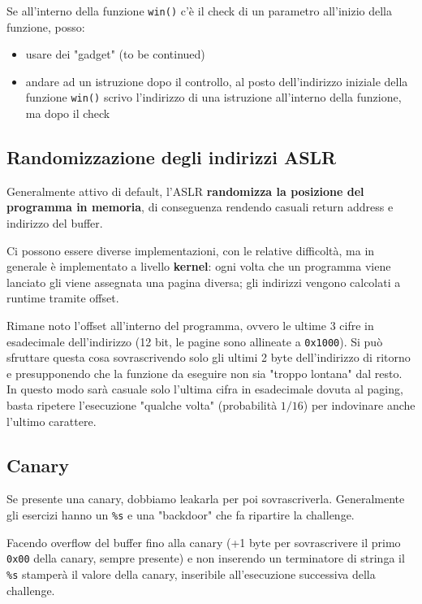 Se all'interno della funzione \texttt{win()} c'è il check di un parametro all'inizio della funzione, posso:
\begin{itemize}
	\item usare dei "gadget" (to be continued)
	
    \item andare ad un istruzione dopo il controllo, al posto dell'indirizzo iniziale della funzione \texttt{win()} scrivo l'indirizzo di una istruzione all'interno della funzione, ma dopo il check
\end{itemize}

\subsection{Randomizzazione degli indirizzi ASLR}

Generalmente attivo di default, l'ASLR \textbf{randomizza la posizione del programma in memoria}, di conseguenza rendendo casuali return address e indirizzo del buffer. 

Ci possono essere diverse implementazioni, con le relative difficoltà, ma in generale è implementato a livello \textbf{kernel}: ogni volta che un programma viene lanciato gli viene assegnata una pagina diversa; gli indirizzi vengono calcolati a runtime tramite offset.

Rimane noto l'offset all'interno del programma, ovvero le ultime 3 cifre in esadecimale dell'indirizzo (12 bit, le pagine sono allineate a \texttt{0x1000}). Si può sfruttare questa cosa sovrascrivendo solo gli ultimi 2 byte dell'indirizzo di ritorno e presupponendo che la funzione da eseguire non sia "troppo lontana" dal resto. In questo modo sarà casuale solo l'ultima cifra in esadecimale dovuta al paging, basta ripetere l'esecuzione "qualche volta" (probabilità $1/16$) per indovinare anche l'ultimo carattere.

\subsection{Canary}

Se presente una canary, dobbiamo leakarla per poi sovrascriverla. Generalmente gli esercizi hanno un \texttt{\%s} e una "backdoor" che fa ripartire la challenge. 

Facendo overflow del buffer fino alla canary (+1 byte per sovrascrivere il primo \texttt{0x00} della canary, sempre presente) e non inserendo un terminatore di stringa il \texttt{\%s} stamperà il valore della canary, inseribile all'esecuzione successiva della challenge.